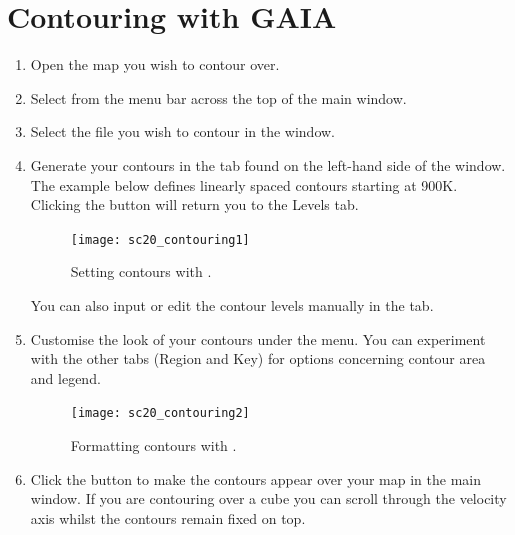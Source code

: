\documentclass[11pt,oneside,chapters]{starlink}
\begin{document}
\section{Contouring with GAIA}
\begin{enumerate}[label=(\textbf{\arabic*})]
\item  Open the map you wish to contour over.

\item Select  from the menu bar
across the top of the main window.

\item Select the file you wish to contour in the  window.

\item Generate your contours in the  tab found on
the left-hand side of the  window. The example
below defines linearly spaced contours starting at 900K. Clicking the
 button will return you to the Levels tab.

\begin{figure}[h!]
\begin{center}
\texttt{[image: sc20\_contouring1]}
\caption[Setting contours with \gaia.]{\label{fig:gaia_contour1}
  Setting contours with \gaia.}
\end{center}
\end{figure}

You can also input or edit the contour levels manually in the  tab.

\item Customise the look of your contours under the
 menu. You can experiment with the other tabs
(Region and Key) for options concerning contour area and legend.

\begin{figure}[h!]
\begin{center}
\texttt{[image: sc20\_contouring2]}
\caption[Formatting contours with \gaia.]{\label{fig:gaia_contour2}
  Formatting contours with \gaia.}
\end{center}
\end{figure}

\item Click the  button to make the contours
appear over your map in the main window. If you are contouring over a
cube you can scroll through the velocity axis whilst the contours
remain fixed on top.


\end{enumerate}
\end{document}
